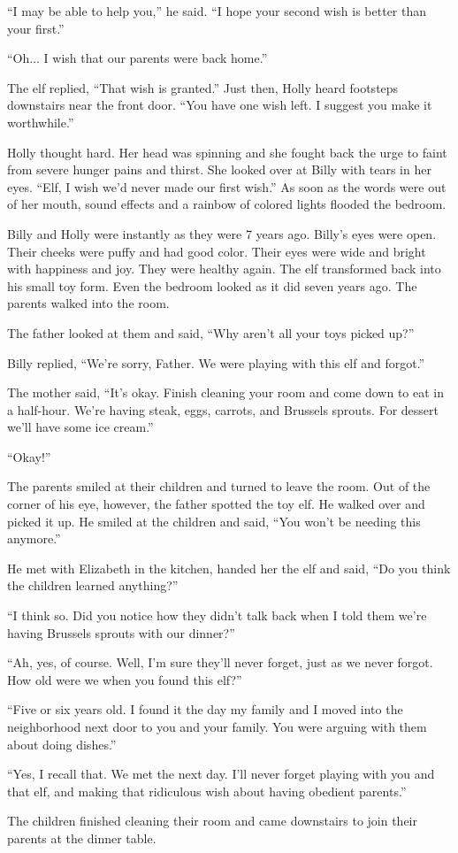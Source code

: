 “I may be able to help you,” he said. “I hope your second wish is better than your first.”

“Oh...  I wish that our parents were back home.”

The elf replied, “That wish is granted.” Just then, Holly heard footsteps downstairs near the front door. “You have one wish left. I suggest you make it worthwhile.”

Holly thought hard. Her head was spinning and she fought back the urge to faint from severe hunger pains and thirst. She looked over at Billy with tears in her eyes. “Elf, I wish we'd never made our first wish.” As soon as the words were out of her mouth, sound effects and a rainbow of colored lights flooded the bedroom.

Billy and Holly were instantly as they were 7 years ago. Billy's eyes were open. Their cheeks were puffy and had good color. Their eyes were wide and bright with happiness and joy. They were healthy again. The elf transformed back into his small toy form. Even the bedroom looked as it did seven years ago. The parents walked into the room.

The father looked at them and said, “Why aren't all your toys picked up?”

Billy replied, “We're sorry, Father. We were playing with this elf and forgot.”

The mother said, “It's okay. Finish cleaning your room and come down to eat in a half-hour. We're having steak, eggs, carrots, and Brussels sprouts. For dessert we'll have some ice cream.”

“Okay!”

The parents smiled at their children and turned to leave the room. Out of the corner of his eye, however, the father spotted the toy elf. He walked over and picked it up. He smiled at the children and said, “You won't be needing this anymore.”

He met with Elizabeth in the kitchen, handed her the elf and said, “Do you think the children learned anything?”

“I think so. Did you notice how they didn't talk back when I told them we're having Brussels sprouts with our dinner?”

“Ah, yes, of course. Well, I'm sure they'll never forget, just as we never forgot. How old were we when you found this elf?”

“Five or six years old. I found it the day my family and I moved into the neighborhood next door to you and your family. You were arguing with them about doing dishes.”

“Yes, I recall that. We met the next day.  I'll never forget playing with you and that elf, and making that ridiculous wish about having obedient parents.”

The children finished cleaning their room and came downstairs to join their parents at the dinner table.